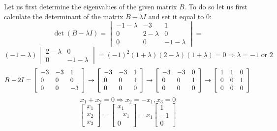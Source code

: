 \documentclass[12pt,letterpaper,reqno]{amsart}
\begin{document}
\begin{enumerate}
\begin{enumerate}
    Let us first determine the eigenvalues of the given matrix $B$. To do so let us first calculate the determinant of the matrix $B - \lambda I$ and set it equal to $0$:
    $$\det(B-\lambda I) = \begin{vmatrix} { -1 - \lambda } & { -3 } & { 1 } \\ { 0 } & { 2 - \lambda } & { 0 } \\ { 0 } & { 0 } & { -1 - \lambda } \end{vmatrix} = $$
    $$(-1- \lambda)\begin{vmatrix} { 2 - \lambda } & { 0 } \\  { 0 } & { -1 - \lambda } \end{vmatrix} = (-1)^2(1 + \lambda)(2 - \lambda)(1 + \lambda) = 0 \Rightarrow \lambda = -1 \text{ or }2$$
    $$B-2I = \left[ \begin{array} { l l l } { -3 } & { -3 } & { 1 } \\ { 0 } & { 0 } & { 0 } \\ { 0 } & { 0 } & { -3 } \end{array} \right] \rightarrow \left[ \begin{array} { l l l } { -3 } & { -3 } & { 1 } \\ { 0 } & { 0 } & { 1 } \\ { 0 } & { 0 } & { 0 } \end{array} \right] \rightarrow \left[ \begin{array} { l l l } { -3 } & { -3 } & { 0 } \\ { 0 } & { 0 } & { 1 } \\ { 0 } & { 0 } & { 0 } \end{array} \right] \rightarrow \left[ \begin{array} { l l l } { 1 } & { 1 } & { 0 } \\ { 0 } & { 0 } & { 1 } \\ { 0 } & { 0 } & { 0 } \end{array} \right]$$
    $$x_1 + x_2 = 0 \Rightarrow x_2 = -x_1, x_3 = 0$$
    $$\left[ \begin{array} { l } { x_1 } \\ { x_2 } \\ { x_3 } \end{array} \right] = \left[ \begin{array} { l } { x_1 } \\ { -x_1 } \\ { 0 } \end{array} \right] = x_1 \left[ \begin{array} { l } { 1 } \\ { -1 } \\ { 0 } \end{array} \right]$$

\end{enumerate}
\end{enumerate}
\end{document}
